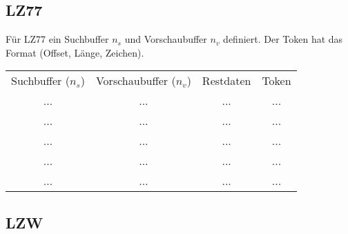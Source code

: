 \subsection{LZ77}
Für LZ77 ein Suchbuffer $n_{s}$ und Vorschaubuffer $n_{v}$ definiert.
Der Token hat das Format (Offset, Länge, Zeichen).
\begin{center}
	\begin{tabular}{ c c c c }
		Suchbuffer ($n_{s}$) & Vorschaubuffer ($n_{v}$) & Restdaten & Token \\
		...                  & ...                      & ...       & ...   \\
		...                  & ...                      & ...       & ...   \\
		...                  & ...                      & ...       & ...   \\
		...                  & ...                      & ...       & ...   \\
		...                  & ...                      & ...       & ...   \\
	\end{tabular}
\end{center}
\subsection{LZW}

